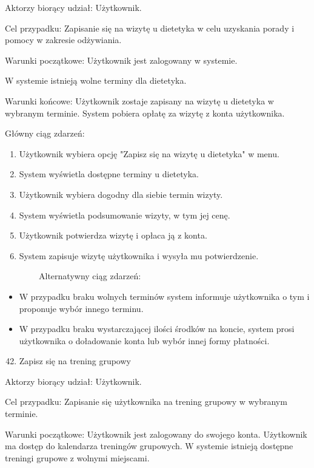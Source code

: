 \documentclass[
]{article}
\providecommand{\tightlist}{%
  \setlength{\itemsep}{0pt}\setlength{\parskip}{0pt}}
\begin{document}
{Aktorzy biorący udział: Użytkownik.}

{Cel przypadku: Zapisanie się na wizytę u dietetyka w celu uzyskania
porady i pomocy w zakresie odżywiania.}

{Warunki początkowe: Użytkownik jest zalogowany w systemie.}

{W systemie istnieją wolne terminy dla dietetyka.}

{Warunki końcowe: Użytkownik zostaje zapisany na wizytę u dietetyka w
wybranym terminie. System pobiera opłatę za wizytę z konta użytkownika.}

{Główny ciąg zdarzeń:}

\begin{enumerate}
\tightlist
\item
  {Użytkownik wybiera opcję "Zapisz się na wizytę u dietetyka" w menu.}
\item
  {System wyświetla dostępne terminy u dietetyka.}
\item
  {Użytkownik wybiera dogodny dla siebie termin wizyty.}
\item
  {System wyświetla podsumowanie wizyty, w tym jej cenę.}
\item
  {Użytkownik potwierdza wizytę i opłaca ją z konta.}
\item
  {System zapisuje wizytę użytkownika i wysyła mu potwierdzenie.}
\end{enumerate}

{~~~~~~~~Alternatywny ciąg zdarzeń:}

\begin{itemize}
\tightlist
\item
  {W przypadku braku wolnych terminów system informuje użytkownika o tym
  i proponuje wybór innego terminu.}
\item
  {W przypadku braku wystarczającej ilości środków na koncie, system
  prosi użytkownika o doładowanie konta lub wybór innej formy
  płatności.}
\end{itemize}

{\hfill\break
}

\begin{enumerate}
\setcounter{enumi}{41}
\tightlist
\item
  {Zapisz się na trening grupowy}
\end{enumerate}

{Aktorzy biorący udział: Użytkownik.}

{Cel przypadku: Zapisanie się użytkownika na trening grupowy w wybranym
terminie.}

{Warunki początkowe: Użytkownik jest zalogowany do swojego konta.
Użytkownik ma dostęp do kalendarza treningów grupowych. W systemie
istnieją dostępne treningi grupowe z wolnymi miejscami.}
\end{document}
